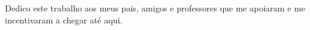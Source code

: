 \newpage
\thispagestyle{empty}
\vspace*{20 cm}

\hfill
\begin{minipage}{8cm}
Dedico este trabalho aos meus pais, amigos e professores que me apoiaram e me incentivaram a chegar até aqui.

\end{minipage}